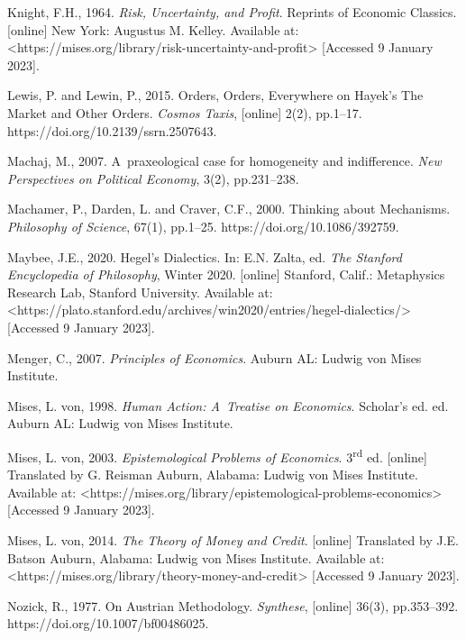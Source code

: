 Knight, F.H., 1964. \textit{Risk, Uncertainty, and Profit}. Reprints of Economic Classics. [online] New York: Augustus M. Kelley. Available at: {\textless}https://mises.org/library/risk-uncertainty-and-profit{\textgreater} [Accessed 9 January 2023].



Lewis, P. and Lewin, P., 2015. Orders, Orders, Everywhere on Hayek's The Market and Other Orders. \textit{Cosmos Taxis}, [online] 2(2), pp.1–17. https://doi.org/10.2139/ssrn.2507643.



Machaj, M., 2007. A~praxeological case for homogeneity and indifference. \textit{New Perspectives on Political Economy}, 3(2), pp.231–238.



Machamer, P., Darden, L. and Craver, C.F., 2000. Thinking about Mechanisms. \textit{Philosophy of Science}, 67(1), pp.1–25. https://doi.org/10.1086/392759.



Maybee, J.E., 2020. Hegel's Dialectics. In: E.N. Zalta, ed. \textit{The Stanford Encyclopedia of Philosophy}, Winter 2020. [online] Stanford, Calif.: Metaphysics Research Lab, Stanford University. Available at: {\textless}https://plato.stanford.edu/archives/win2020/entries/hegel-dialectics/{\textgreater} [Accessed 9 January 2023].



Menger, C., 2007. \textit{Principles of Economics}. Auburn AL: Ludwig von Mises Institute.



Mises, L. von, 1998. \textit{Human Action: A~Treatise on Economics}. Scholar's ed. ed. Auburn AL: Ludwig von Mises Institute.



Mises, L. von, 2003. \textit{Epistemological Problems of Economics}. 3\textsuperscript{rd} ed. [online] Translated by G. Reisman Auburn, Alabama: Ludwig von Mises Institute. Available at: {\textless}https://mises.org/library/epistemological-problems-economics{\textgreater} [Accessed 9 January 2023].



Mises, L. von, 2014. \textit{The Theory of Money and Credit}. [online] Translated by J.E. Batson Auburn, Alabama: Ludwig von Mises Institute. Available at: {\textless}https://mises.org/library/theory-money-and-credit{\textgreater} [Accessed 9 January 2023].



Nozick, R., 1977. On Austrian Methodology. \textit{Synthese}, [online] 36(3), pp.353–392. https://doi.org/10.1007/bf00486025.



